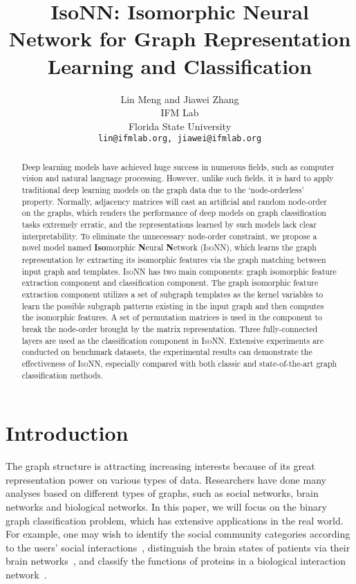 \documentclass{article} \usepackage{iclr2020_conference,times}
\title{IsoNN: Isomorphic Neural Network for Graph Representation Learning and Classification}
\author{Lin Meng and Jiawei Zhang  \\
IFM Lab\\
Florida State University\\
\texttt{lin@ifmlab.org, jiawei@ifmlab.org} \\
}
\newcommand{\our}{\textsc{IsoNN}}
\begin{document}
\maketitle


\begin{abstract}
\vspace{-5pt}
	Deep learning models have achieved huge success in numerous fields, such as computer vision and natural language processing. However, unlike such fields, it is hard to apply traditional deep learning models on the graph data due to the `node-orderless' property. Normally, adjacency matrices will cast an artificial and random node-order on the graphs, which renders the performance of deep models on graph classification tasks extremely erratic, and the representations learned by such models lack clear interpretability. To eliminate the unnecessary node-order constraint, we propose a novel model named \textbf{Iso}morphic \textbf{N}eural \textbf{N}etwork ({\our}), which learns the graph representation by extracting its isomorphic features via the graph matching between input graph and templates.  {\our} has two main components: graph isomorphic feature extraction component and classification component. The graph isomorphic feature extraction component utilizes a set of subgraph templates as the kernel variables to learn the possible subgraph patterns existing in the input graph and then computes the isomorphic features. A set of permutation matrices is used in the component to break the node-order brought by the matrix representation. Three fully-connected layers are used as the classification component in {\our}. Extensive experiments are conducted on benchmark datasets, the experimental results can demonstrate the effectiveness of {\our}, especially compared with both classic and state-of-the-art graph classification methods.
	
\end{abstract}





 

\vspace*{-10pt}
\section{Introduction}\label{sec:introduction}
\vspace*{-5pt}
The graph structure is attracting increasing interests because of its great representation power on various types of data. Researchers have done many analyses based on different types of graphs, such as social networks, brain networks and biological networks. In this paper, we will focus on the binary graph classification problem, which has extensive applications in the real world. For example, one may wish to identify the social community categories according to the users' social interactions~\cite{gao2017identifying}, distinguish the brain states of patients via their brain networks~\cite{wang2017structural}, and classify the functions of proteins in a biological interaction network~\cite{hamilton2017inductive}.
\end{document}
